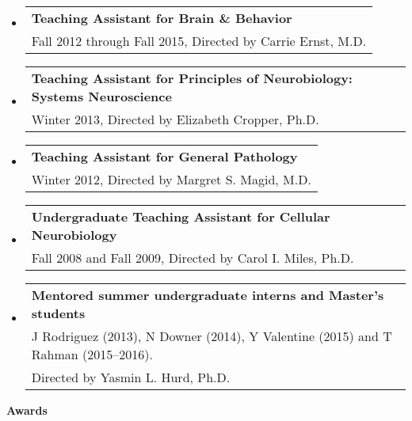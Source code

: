 \documentclass[10pt]{article}
\begin{document}
\begin{itemize}

\item
  \begin{tabular*}{6.5in}{l}
    \textbf{Teaching Assistant for Brain \& Behavior} \\
    Fall 2012 through Fall 2015, Directed by Carrie Ernst, M.D. \\
  \end{tabular*}
\item
  \begin{tabular*}{6.5in}{l}
    \textbf{Teaching Assistant for Principles of Neurobiology: Systems Neuroscience} \\
    Winter 2013, Directed by Elizabeth Cropper, Ph.D. \\
  \end{tabular*}
\item
  \begin{tabular*}{6.5in}{l}
    \textbf{Teaching Assistant for General Pathology} \\
    Winter 2012, Directed by Margret S. Magid, M.D. \\
  \end{tabular*}
\item
  \begin{tabular*}{6.5in}{l}
    \textbf{Undergraduate Teaching Assistant for Cellular Neurobiology} \\
    Fall 2008 and Fall 2009, Directed by Carol I. Miles, Ph.D. \\
  \end{tabular*}  
\item
  \begin{tabular*}{6.5in}{l}
    \textbf{Mentored summer undergraduate interns and Master's students} \\
    J Rodriguez (2013), N Downer (2014), Y Valentine (2015) and T Rahman (2015--2016).\\
    Directed by Yasmin L. Hurd, Ph.D. \\
  \end{tabular*}  
\end{itemize}

\vspace{0.1in}
{\large \textbf{Awards}}
\end{document}
